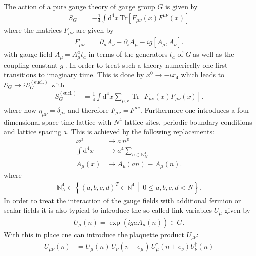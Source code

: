 The action of a pure gauge theory of gauge group $G$ is given by
\begin{align*}
 S_G & = -\frac{1}{4} \int \mathrm{d}^4 x \, \mathrm{Tr} \left[ F_{\mu \nu} (x) F^{\mu \nu} (x) \right]
\end{align*}
where the matrices $F_{\mu \nu}$ are given by
\begin{align*}
 F_{\mu \nu} & =  \partial_\mu A_\nu - \partial_\nu A_\mu  -  i g [A_\mu, A_\nu] \textrm{.}
\end{align*}
with gauge field $A_\mu = A_\mu^a t_a$ in terms of the generators $t_a$ of $G$ as well as the coupling constant $g$ \cite{Peskin:1995}. In order to treat such a theory numerically one first transitions to imaginary time. This is done by $x^0 \rightarrow -i x_4$ which leads to $S_G \rightarrow i S_G^{(\textrm{eucl.})}$ with
\begin{align*}
 S_G^{(\textrm{eucl.})} & = \frac{1}{4} \int \mathrm{d}^4 x  \sum_{\mu,\nu}  \, \mathrm{Tr} \left[ F_{\mu \nu} (x) F_{\mu \nu} (x) \right] \textrm{.}
\end{align*}
where now $\eta_{\mu \nu} = \delta_{\mu \nu}$ and therefore $F_{\mu \nu} = F^{\mu \nu}$. Furthermore one introduces a four dimensional space-time lattice  with $N^4$ lattice sites, periodic boundary conditions and lattice spacing $a$. This is achieved by the following replacements:
\begin{align*}
 x^\mu               & \rightarrow a \, n^\mu                           \\
 \int \mathrm{d}^4 x & \rightarrow a^4 \sum_{n \in \mathbb{N}^4_N}        \\
 A_\mu (x)           & \rightarrow A_\mu(an) \equiv A_\mu(n) \textrm{.}
\end{align*}
where
\begin{align*}
 \mathbb{N}^4_N \in \left\{ (a,b,c,d)^T \in \mathbb{N}^4 \, \middle| \, 0 \le a,b,c,d < N \right\} \textrm{.}
\end{align*}
In order to treat the interaction of the gauge fields with additional fermion or scalar fields it is also typical to introduce the so called link variables $U_\mu$ given by
\begin{align*}
 U_\mu(n) = \exp \left( i g a A_\mu(n) \right) \in G \textrm{.}
\end{align*}
With this in place one can introduce the plaquette product $U_{\mu \nu}$:
\begin{align*}
 U_{\mu \nu}(n) & = U_\mu(n) \, U_\nu(n+e_\mu) \, U^\dagger_\mu (n + e_\nu) U^\dagger_\nu(n)
\end{align*}
